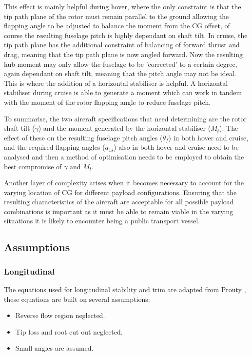 \documentclass[11pt,a4paper]{article}
\begin{document}
This effect is mainly helpful during hover, where the only constraint is that the tip path plane of the rotor must remain parallel to the ground allowing the flapping angle to be adjusted to balance the moment from the CG offset, of course the resulting fuselage pitch is highly dependant on shaft tilt. In cruise, the tip path plane has the additional constraint of balancing of forward thrust and drag, meaning that the tip path plane is now angled forward. Now the resulting hub moment may only allow the fuselage to be 'corrected' to a certain degree, again dependant on shaft tilt, meaning that the pitch angle may not be ideal. This is where the addition of a horizontal stabiliser is helpful. A horizontal stabiliser during cruise is able to generate a moment which can work in tandem with the moment of the rotor flapping angle to reduce fuselage pitch.

To summarise, the two aircraft specifications that need determining are the rotor shaft tilt ($\gamma$) and the moment generated by the horizontal stabiliser ($M_t$). The effect of these on the resulting fuselage pitch angles ($\theta_f$) in both hover and cruise, and the required flapping angles ($a_{1s}$) also in both hover and cruise need to be analysed and then a method of optimisation needs to be employed to obtain the best compromise of $\gamma$ and $M_t$.

Another layer of complexity arises when it becomes necessary to account for the varying location of CG for different payload configurations. Ensuring that the resulting characteristics of the aircraft are acceptable for all possible payload combinations is important as it must be able to remain viable in the varying situations it is likely to encounter being a public transport vessel.
\subsection{Assumptions}
\subsubsection{Longitudinal}
The equations used for longitudinal stability and trim are adapted from Prouty \cite{prouty}, these equations are built on several assumptions:

\begin{itemize}
    \item Reverse flow region neglected.
    \item Tip loss and root cut out neglected.
    \item Small angles are assumed.
\end{itemize}{}
\end{document}
